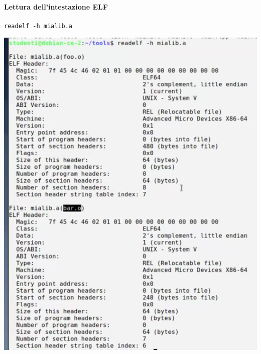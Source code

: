 \documentclass[11pt]{report}
\theoremstyle{definition}
\begin{document}
\begin{multicols}{2}
\paragraph{Lettura dell'intestazione ELF}
\begin{verbatim}
readelf -h mialib.a
\end{verbatim}
\begin{center}
\includegraphics[scale=0.70]{img/61.png}
\end{center}
\columnbreak

\end{multicols}
\end{document}
